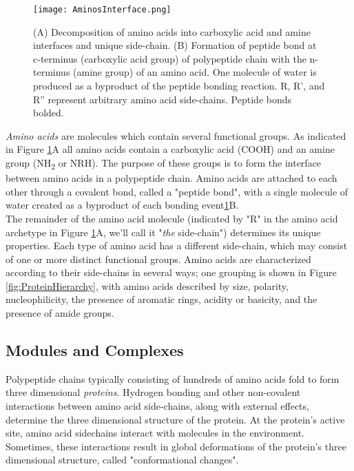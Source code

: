{%


\begin{figure}
  \texttt{[image: AminosInterface.png]}
  \caption{(A) Decomposition of amino acids into carboxylic acid and amine interfaces and unique side-chain. (B) Formation of peptide bond at c-terminus (carboxylic acid group) of polypeptide chain with the n-terminus (amine group) of an amino acid. One molecule of water is produced as a byproduct of the peptide bonding reaction.  R, R', and R'' represent arbitrary amino acid side-chains.  Peptide bonds bolded.}
  \label{fig:AminosInterface}
\end{figure}

\textit{Amino acids} are molecules which contain several functional groups.  As indicated in Figure \ref{fig:AminosInterface}A all amino acids contain a carboxylic acid (COOH) and an amine group (NH\textsubscript{2} or NRH).  The purpose of these groups is to form the interface between amino acids in a polypeptide chain.  Amino acids are attached to each other through a covalent bond, called a "peptide bond", with a single molecule of water created as a byproduct of each bonding event\ref{fig:AminosInterface}B.\\

The remainder of the amino acid molecule (indicated by "R" in the amino acid archetype in Figure \ref{fig:AminosInterface}A, we'll call it "\textit{the} side-chain") determines its unique properties.  Each type of amino acid has a different side-chain, which may consist of one or more distinct functional groups.  Amino acids are characterized according to their side-chains in several ways; one grouping is shown in Figure \ref{fig:ProteinHierarchy}, with amino acids described by size, polarity, nucleophilicity, the presence of aromatic rings, acidity or basicity, and the presence of amide groups.\\

 \subsection{Modules and Complexes}

Polypeptide chains typically consisting of hundreds of amino acids fold to form three dimensional \textit{proteins}.  Hydrogen bonding and other non-covalent interactions between amino acid side-chains, along with external effects, determine the three dimensional structure of the protein.  At the protein's active site, amino acid sidechains interact with molecules in the environment.  Sometimes, these interactions result in global deformations of the protein's three dimensional structure, called "conformational changes".\\

}
